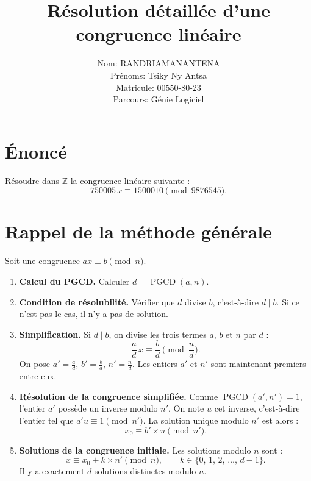 \documentclass[12pt,a4paper]{article}
\title{Résolution détaillée d'une congruence linéaire}
\author{Nom: RANDRIAMANANTENA \\
Prénoms: Tsiky Ny Antsa \\
Matricule: 00550-80-23 \\
Parcours: Génie Logiciel}
\date{}
\begin{document}
\maketitle

\section*{Énoncé}
Résoudre dans $\mathbb{Z}$ la congruence linéaire suivante :
\begin{equation}\label{eq:congruence}
750005\,x \equiv 1500010 \pmod{9876545}.
\end{equation}

\section*{Rappel de la méthode générale}

Soit une congruence $ax \equiv b \pmod{n}$.

\begin{enumerate}
    \item \textbf{Calcul du PGCD.} Calculer $d = \operatorname{PGCD}(a, n)$.
    \item \textbf{Condition de résolubilité.} Vérifier que $d$ divise $b$, c'est-à-dire $d \mid b$.
          Si ce n'est pas le cas, il n'y a pas de solution.
    \item \textbf{Simplification.} Si $d \mid b$, on divise les trois termes $a$, $b$ et $n$ par $d$ :
          \[
          \frac{a}{d}\,x \equiv \frac{b}{d} \pmod{\frac{n}{d}}.
          \]
          On pose $a' = \frac{a}{d}$, $b' = \frac{b}{d}$, $n' = \frac{n}{d}$.
          Les entiers $a'$ et $n'$ sont maintenant premiers entre eux.
    \item \textbf{Résolution de la congruence simplifiée.}
          Comme $\operatorname{PGCD}(a', n') = 1$, l'entier $a'$ possède un inverse modulo $n'$.
          On note $u$ cet inverse, c'est-à-dire l'entier tel que $a'u \equiv 1 \pmod{n'}$.
          La solution unique modulo $n'$ est alors :
          \[
          x_0 \equiv b' \times u \pmod{n'}.
          \]
    \item \textbf{Solutions de la congruence initiale.}
          Les solutions modulo $n$ sont :
          \[
          x \equiv x_0 + k \times n' \pmod{n}, \qquad k \in \{0,\,1,\,2,\,\dots,\,d-1\}.
          \]
          Il y a exactement $d$ solutions distinctes modulo $n$.
\end{enumerate}

\newpage
\end{document}
